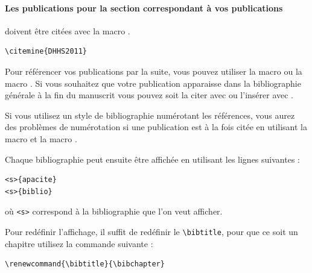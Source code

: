 \paragraph{Les publications pour la section correspondant à vos publications} doivent être citées avec la macro .

\begin{framed}
  \noindent{} \vspace{-0.75em}
  \begin{verbatim}\citemine{DHHS2011}\end{verbatim}\vspace{-0.75em}
\end{framed}

Pour référencer vos publications par la suite, vous pouvez utiliser la macro  ou la macro .
Si vous souhaitez que votre publication apparaisse dans la bibliographie générale à la fin du manuscrit vous pouvez soit la citer avec  ou l'insérer avec . \nocite{DHHS2011}

\begin{remark}
  Si vous utilisez un style de bibliographie numérotant les références, vous aurez des problèmes de numérotation si une publication est à la fois citée en utilisant la macro  et la macro .
\end{remark}


Chaque bibliographie peut ensuite être affichée en utilisant les lignes suivantes :

\begin{framed}\vspace{-0.75em}
  \begin{verbatim}<s>{apacite}
<s>{biblio}
\end{verbatim}\vspace{-0.75em}
\end{framed}

où \verb|<s>| correspond à la bibliographie que l'on veut afficher.

Pour redéfinir l'affichage, il suffit de redéfinir le \verb|\bibtitle|, pour que ce soit un chapitre utilisez la commande suivante :

\begin{framed}\vspace{-0.75em}
  \begin{verbatim}\renewcommand{\bibtitle}{\bibchapter}
\end{verbatim}\vspace{-0.75em}
\end{framed}

